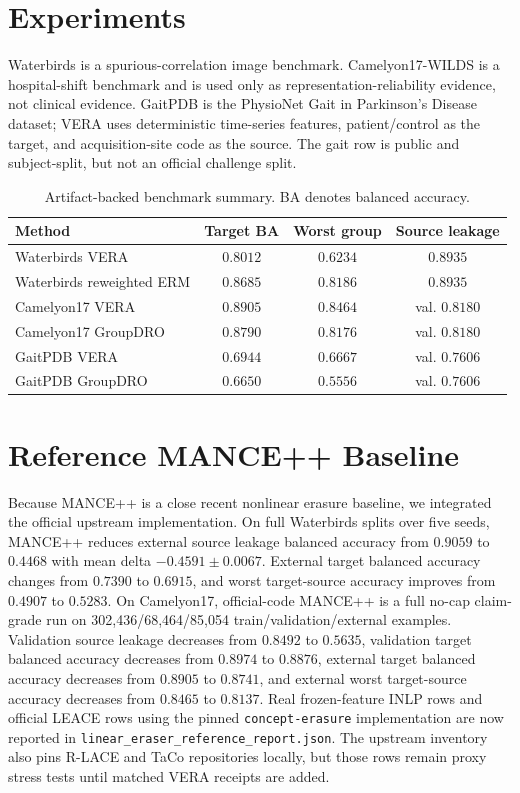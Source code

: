 \documentclass{article}
\begin{document}
\section{Experiments}

Waterbirds is a spurious-correlation image benchmark. Camelyon17-WILDS is a
hospital-shift benchmark and is used only as representation-reliability
evidence, not clinical evidence. GaitPDB is the PhysioNet Gait in Parkinson's
Disease dataset; VERA uses deterministic time-series features, patient/control
as the target, and acquisition-site code as the source. The gait row is public
and subject-split, but not an official challenge split.

\begin{table}[t]
\centering
\caption{Artifact-backed benchmark summary. BA denotes balanced accuracy.}
\label{tab:main}
\begin{tabular}{@{}lccc@{}}
\toprule
Method & Target BA & Worst group & Source leakage \\
\midrule
Waterbirds VERA & $0.8012$ & $0.6234$ & $0.8935$ \\
Waterbirds reweighted ERM & $0.8685$ & $0.8186$ & $0.8935$ \\
Camelyon17 VERA & $0.8905$ & $0.8464$ & val. $0.8180$ \\
Camelyon17 GroupDRO & $0.8790$ & $0.8176$ & val. $0.8180$ \\
GaitPDB VERA & $0.6944$ & $0.6667$ & val. $0.7606$ \\
GaitPDB GroupDRO & $0.6650$ & $0.5556$ & val. $0.7606$ \\
\bottomrule
\end{tabular}
\end{table}

\section{Reference MANCE++ Baseline}

Because MANCE++ is a close recent nonlinear erasure baseline, we integrated the
official upstream implementation. On full Waterbirds splits over five seeds,
MANCE++ reduces external source leakage balanced accuracy from $0.9059$ to
$0.4468$ with mean delta $-0.4591 \pm 0.0067$. External target balanced
accuracy changes from $0.7390$ to $0.6915$, and worst target-source accuracy
improves from $0.4907$ to $0.5283$. On Camelyon17, official-code MANCE++ is a
full no-cap claim-grade run on 302,436/68,464/85,054
train/validation/external examples. Validation source leakage decreases from
$0.8492$ to $0.5635$, validation target balanced accuracy decreases from
$0.8974$ to $0.8876$, external target balanced accuracy decreases from
$0.8905$ to $0.8741$, and external worst target-source accuracy decreases from
$0.8465$ to $0.8137$. Real frozen-feature INLP rows and official LEACE rows
using the pinned \texttt{concept-erasure} implementation are now reported in
\texttt{linear\_eraser\_reference\_report.json}. The upstream inventory also
pins R-LACE and TaCo repositories locally, but those rows remain proxy stress
tests until matched VERA receipts are added.
\end{document}
